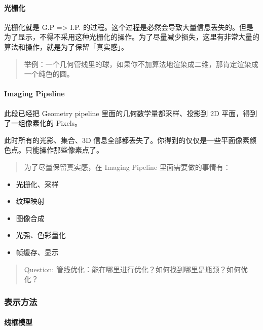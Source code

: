 \documentclass[
]{article}
\begin{document}
\hypertarget{header-n180}{%
\paragraph{光栅化}\label{header-n180}}

光栅化就是 G.P =\textgreater{} I.P.
的过程。这个过程是必然会导致大量信息丢失的。但是为了显示，不得不采用这种光栅化的操作。为了尽量减少损失，这里有非常大量的算法和操作，就是为了保留「真实感」。

\begin{quote}
举例：一个几何管线里的球，如果你不加算法地渲染成二维，那肯定渲染成一个纯色的圆。
\end{quote}

\hypertarget{header-n184}{%
\paragraph{Imaging Pipeline}\label{header-n184}}

此段已经把 Geometry pipeline 里面的几何数学量都采样、投影到 2D
平面，得到了一组像素化的 Pixels。

此时所有的光影、集合、3D
信息全部都丢失了。你得到的仅仅是一些平面像素颜色点。只能操作那些像素点了。

\begin{quote}
为了尽量保留真实感，在 Imaging Pipeline 里面需要做的事情有：
\end{quote}

\begin{itemize}
\item
  光栅化、采样
\item
  纹理映射
\item
  图像合成
\item
  光强、色彩量化
\item
  帧缓存、显示
\end{itemize}

\begin{quote}
Question: 管线优化：能在哪里进行优化？如何找到哪里是瓶颈？如何优化？
\end{quote}

\hypertarget{header-n202}{%
\subsubsection{表示方法}\label{header-n202}}

\hypertarget{header-n203}{%
\paragraph{线框模型}\label{header-n203}}
\end{document}
